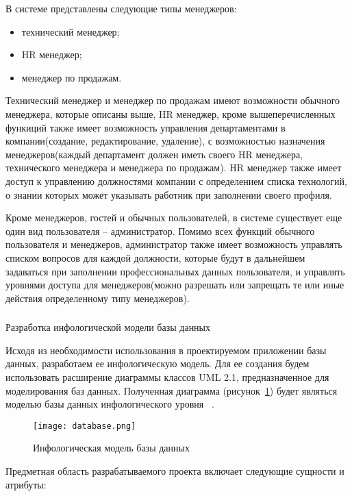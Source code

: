 В системе представлены следующие типы менеджеров:

\begin{itemize}
	\item технический менеджер;
	\item HR менеджер;
	\item менеджер по продажам.
\end{itemize}

Технический менеджер и менеджер по продажам имеют возможности обычного менеджера, которые описаны выше, HR менеджер,
кроме вышеперечисленных функиций также имеет возможность управления департаментами в компании(создание, редактирование,
удаление), с возможностью назначения менеджеров(каждый департамент должен иметь своего HR менеджера, технического
менеджера и менеджера по продажам). HR менеджер также имеет доступ к управлению должностями компании с определением
списка технологий, о знании которых может указывать работник при заполнении своего профиля.

Кроме менеджеров, гостей и обычных пользователей, в системе существует еще один вид пользователя -- администратор. 
Помимо всех функций обычного пользователя и менеджеров, администратор также имеет возможность управлять списком
вопросов для каждой должности, которые будут в дальнейшем задаваться при заполнении профессиональных данных пользователя,
и управлять уровнями доступа для менеджеров(можно разрешать или запрещать те или иные действия определенному типу
менеджеров).

\subsubsection{} Разработка инфологической модели базы данных
\label{sec:domain:model:database}

Исходя из необходимости использования в проектируемом приложении базы данных, разработаем ее инфологическую модель.
Для ее создания будем использовать расширение диаграммы классов UML 2.1, предназначенное для моделирования баз данных.
Полученная диаграмма (рисунок~\ref{fig:domain:model:db:model}) будет являться моделью базы данных инфологического
уровня ~\cite{kulikov_db_workbook}.

\begin{figure}[!ht]
	\centering
	\texttt{[image: database.png]} 
	\caption{Инфологическая модель базы данных}
	\label{fig:domain:model:db:model}
\end{figure}

Предметная область разрабатываемого проекта включает следующие сущности и атрибуты:

